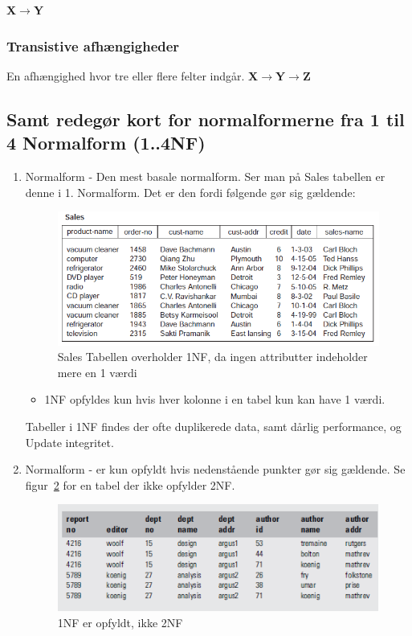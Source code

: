 \textbf{X$\rightarrow$Y}
\subsubsection{Transistive afhængigheder}
En afhængighed hvor tre eller flere felter indgår.
\textbf{X$\rightarrow$Y$\rightarrow$Z}
\subsection{Samt redegør kort for normalformerne fra 1 til 4 Normalform (1..4NF)}

\begin{enumerate}
	\item Normalform - Den mest basale normalform. Ser man på Sales tabellen er denne i 1. Normalform. Det er den fordi følgende gør sig gældende:
		\begin{figure}
			\centering
			\includegraphics[width=0.7\linewidth]{figs/spm5/notNormalizedTable.PNG}
			\caption{Sales Tabellen overholder 1NF, da ingen attributter indeholder mere en 1 værdi}
			\label{fig:notNormalizedTable}
		\end{figure}
	\begin{itemize}
		\item 1NF opfyldes kun hvis hver kolonne i en tabel kun kan have 1 værdi.
	\end{itemize}
	Tabeller i 1NF findes der ofte duplikerede data, samt dårlig performance, og Update integritet.
	
	\item Normalform - er kun opfyldt hvis nedenstående punkter gør sig gældende. Se figur~\ref{fig:not2NF} for en tabel der ikke opfylder 2NF.
	
	\begin{figure}
		\centering
		\includegraphics[width=0.7\linewidth]{figs/spm5/not2NF.PNG}
		\caption{1NF er opfyldt, ikke 2NF}
		\label{fig:not2NF}
	\end{figure}
	

\end{enumerate}
